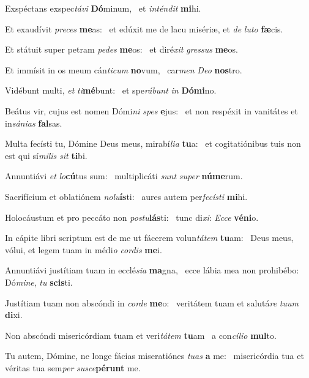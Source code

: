 \item Exspéctans exspec\textit{távi} \textbf{Dó}minum,~\psstar{} et \textit{inténdit} \textbf{mi}hi.
\item Et exaudívit \textit{preces} \textbf{me}as:~\psstar{} et edúxit me de lacu misériæ, et \textit{de} \textit{luto} \textbf{fæ}cis.
\item Et státuit super petram \textit{pedes} \textbf{me}os:~\psstar{} et diré\textit{xit} \textit{gressus} \textbf{me}os.
\item Et immísit in os meum cán\textit{ticum} \textbf{no}vum,~\psstar{} car\textit{men} \textit{Deo} \textbf{nos}tro.
\item Vidébunt multi, \textit{et} \textit{ti}\textbf{mé}bunt:~\psstar{} et spe\textit{rábunt} \textit{in} \textbf{Dó}\textbf{mi}no.
\item Beátus vir, cujus est nomen Dómi\textit{ni} \textit{spes} \textbf{e}jus:~\psstar{} et non respéxit in vanitátes et in\textit{sánias} \textbf{fal}sas.
\item Multa fecísti tu, Dómine Deus meus, mirabí\textit{lia} \textbf{tu}a:~\psstar{} et cogitatiónibus tuis non est qui sí\textit{milis} \textit{sit} \textbf{ti}bi.
\item Annuntiávi \textit{et} \textit{lo}\textbf{cú}tus sum:~\psstar{} multiplicáti \textit{sunt} \textit{super} \textbf{nú}\textbf{me}rum.
\item Sacrifícium et oblatiónem \textit{nolu}\textbf{ís}ti:~\psstar{} aures autem per\textit{fecísti} \textbf{mi}hi.
\item Holocáustum et pro peccáto non \textit{postu}\textbf{lás}ti:~\psstar{} tunc di\textit{xi}: \textit{Ecce} \textbf{vé}\textbf{ni}o.
\item In cápite libri scriptum est de me ut fácerem volun\textit{tátem} \textbf{tu}am:~\psstar{} Deus meus, vólui, et legem tuam in médi\textit{o} \textit{cordis} \textbf{me}i.
\item Annuntiávi justítiam tuam in ecclé\textit{sia} \textbf{ma}gna,~\psstar{} ecce lábia mea non prohibébo: Dó\textit{mine}, \textit{tu} \textbf{scis}ti.
\item Justítiam tuam non abscóndi in \textit{corde} \textbf{me}o:~\psstar{} veritátem tuam et salutá\textit{re} \textit{tuum} \textbf{di}xi.
\item Non abscóndi misericórdiam tuam et veri\textit{tátem} \textbf{tu}am~\psstar{} a con\textit{cílio} \textbf{mul}to.
\item Tu autem, Dómine, ne longe fácias miseratiónes \textit{tuas} \textbf{a} me:~\psstar{} misericórdia tua et véritas tua sem\textit{per} \textit{susce}\textbf{pé}\textbf{runt} me.
